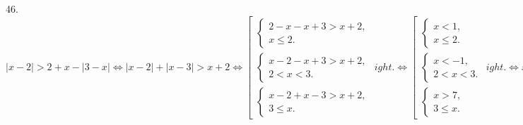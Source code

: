 46. $|x-2|>2+x-|3-x|\Leftrightarrow |x-2|+|x-3|>x+2\Leftrightarrow\left[\begin{array}{l} \begin{cases} 2-x-x+3>x+2,\\
x\leqslant2.\end{cases}\\ \begin{cases} x-2-x+3>x+2,\\ 2<x<3.\end{cases} \\ \begin{cases} x-2+x-3>x+2,\\ 3\leqslant x.\end{cases}\end{array}
ight.\Leftrightarrow
\left[\begin{array}{l} \begin{cases} x<1,\\
x\leqslant2.\end{cases}\\ \begin{cases} x<-1,\\ 2<x<3.\end{cases} \\ \begin{cases} x>7,\\ 3\leqslant x.\end{cases}\end{array}
ight.\Leftrightarrow
x\in(-\infty;1)\cup(7;+\infty).$\\
